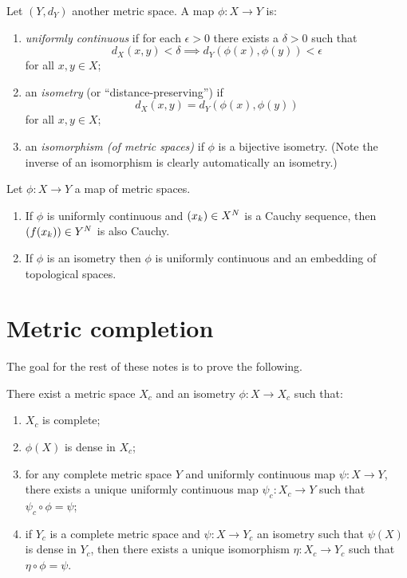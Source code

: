 \begin{definition}
  Let $(Y, d_Y)$ another metric space. A map $\phi : X \to Y$ is:
  \begin{enumerate}
  \item \textit{uniformly continuous} if for each $\epsilon > 0$ there
    exists a $\delta > 0$ such that
    \[
    d_X(x,y) < \delta \implies d_Y(\phi(x),\phi(y)) < \epsilon
    \]
    for all $x,y \in X$;
  \item an \textit{isometry} (or ``distance-preserving'') if
    \[
    d_X(x,y) = d_Y(\phi(x),\phi(y))
    \]
    for all $x,y \in X$;
  \item an \textit{isomorphism (of metric spaces)} if $\phi$ is a
    bijective isometry. (Note the inverse of an isomorphism is clearly
    automatically an isometry.)
  \end{enumerate}
\end{definition}

\begin{exercise}
  \label{maps}
  Let $\phi : X \to Y$ a map of metric spaces.
  \begin{enumerate}
  \item If $\phi$ is uniformly continuous and $(x_k) \in X^N$ is a
    Cauchy sequence, then $(f(x_k)) \in Y^N$ is also Cauchy.
  \item If $\phi$ is an isometry then $\phi$ is uniformly continuous
    and an embedding of topological spaces.
  \end{enumerate}
\end{exercise}


\section{Metric completion}

The goal for the rest of these notes is to prove the following.

\begin{proposition}
  \label{completion}
  There exist a metric space $X_c$ and an isometry $\phi : X \to X_c$
  such that:
  \begin{enumerate}
  \item $X_c$ is complete;
  \item $\phi(X)$ is dense in $X_c$;
  \item for any complete metric space $Y$ and uniformly continuous map
    $\psi : X \to Y$, there exists a unique uniformly continuous map
    $\psi_c : X_c \to Y$ such that $\psi_c \circ \phi = \psi$;
  \item if $Y_c$ is a complete metric space and $\psi : X \to Y_c$ an
    isometry such that $\psi(X)$ is dense in $Y_c$, then there exists
    a unique isomorphism $\eta : X_c \to Y_c$ such that $\eta \circ
    \phi = \psi$.
  \end{enumerate}
\end{proposition}

